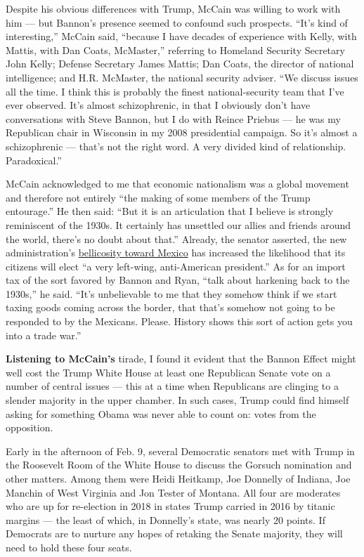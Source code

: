 Despite his obvious differences with Trump, McCain was willing to work
with him --- but Bannon's presence seemed to confound such prospects.
``It's kind of interesting,'' McCain said, ``because I have decades of
experience with Kelly, with Mattis, with Dan Coats, McMaster,''
referring to Homeland Security Secretary John Kelly; Defense Secretary
James Mattis; Dan Coats, the director of national intelligence; and H.R.
McMaster, the national security adviser. ``We discuss issues all the
time. I think this is probably the finest national-security team that
I've ever observed. It's almost schizophrenic, in that I obviously don't
have conversations with Steve Bannon, but I do with Reince Priebus ---
he was my Republican chair in Wisconsin in my 2008 presidential
campaign. So it's almost a schizophrenic --- that's not the right word.
A very divided kind of relationship. Paradoxical.''

McCain acknowledged to me that economic nationalism was a global
movement and therefore not entirely ``the making of some members of the
Trump entourage.'' He then said: ``But it is an articulation that I
believe is strongly reminiscent of the 1930s. It certainly has unsettled
our allies and friends around the world, there's no doubt about that.''
Already, the senator asserted, the new administration's
\href{https://www.nytimes3xbfgragh.onion/2017/01/24/us/politics/wall-border-trump.html}{bellicosity
toward Mexico} has increased the likelihood that its citizens will elect
``a very left-wing, anti-American president.'' As for an import tax of
the sort favored by Bannon and Ryan, ``talk about harkening back to the
1930s,'' he said. ``It's unbelievable to me that they somehow think if
we start taxing goods coming across the border, that that's somehow not
going to be responded to by the Mexicans. Please. History shows this
sort of action gets you into a trade war.''

\textbf{Listening to McCain's} tirade, I found it evident that the
Bannon Effect might well cost the Trump White House at least one
Republican Senate vote on a number of central issues --- this at a time
when Republicans are clinging to a slender majority in the upper
chamber. In such cases, Trump could find himself asking for something
Obama was never able to count on: votes from the opposition.

Early in the afternoon of Feb. 9, several Democratic senators met with
Trump in the Roosevelt Room of the White House to discuss the Gorsuch
nomination and other matters. Among them were Heidi Heitkamp, Joe
Donnelly of Indiana, Joe Manchin of West Virginia and Jon Tester of
Montana. All four are moderates who are up for re-election in 2018 in
states Trump carried in 2016 by titanic margins --- the least of which,
in Donnelly's state, was nearly 20 points. If Democrats are to nurture
any hopes of retaking the Senate majority, they will need to hold these
four seats.

